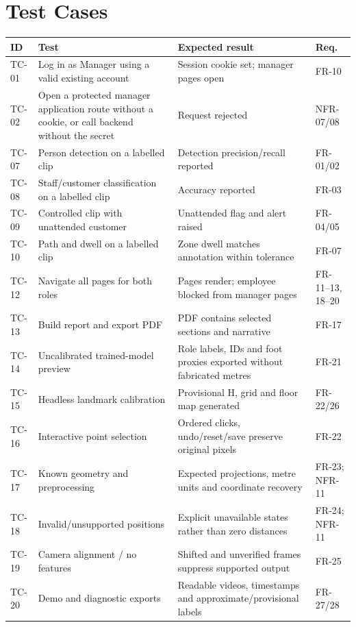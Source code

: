 \section{Test Cases}
\begin{longtable}{P{0.09\textwidth}P{0.3\textwidth}P{0.32\textwidth}P{0.14\textwidth}}
\toprule
ID & Test & Expected result & Req.\\
\midrule
\endhead
TC-01 & Log in as Manager using a valid existing account & Session cookie set; manager pages open & FR-10\\
TC-02 & Open a protected manager application route without a cookie, or call backend without the secret & Request rejected & NFR-07/08\\
TC-07 & Person detection on a labelled clip & Detection precision/recall reported & FR-01/02\\
TC-08 & Staff/customer classification on a labelled clip & Accuracy reported & FR-03\\
TC-09 & Controlled clip with unattended customer & Unattended flag and alert raised & FR-04/05\\
TC-10 & Path and dwell on a labelled clip & Zone dwell matches annotation within tolerance & FR-07\\
TC-12 & Navigate all pages for both roles & Pages render; employee blocked from manager pages & FR-11--13, 18--20\\
TC-13 & Build report and export PDF & PDF contains selected sections and narrative & FR-17\\
TC-14 & Uncalibrated trained-model preview & Role labels, IDs and foot proxies exported without fabricated metres & FR-21\\
TC-15 & Headless landmark calibration & Provisional H, grid and floor map generated & FR-22/26\\
TC-16 & Interactive point selection & Ordered clicks, undo/reset/save preserve original pixels & FR-22\\
TC-17 & Known geometry and preprocessing & Expected projections, metre units and coordinate recovery & FR-23; NFR-11\\
TC-18 & Invalid/unsupported positions & Explicit unavailable states rather than zero distances & FR-24; NFR-11\\
TC-19 & Camera alignment / no features & Shifted and unverified frames suppress supported output & FR-25\\
TC-20 & Demo and diagnostic exports & Readable videos, timestamps and approximate/provisional labels & FR-27/28\\

\end{longtable}
